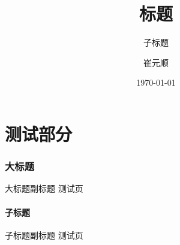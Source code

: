 \documentclass[10pt,mathserif]{beamer}%
\title{标题}
\subtitle{子标题}
\institute[西安电子科技大学\\数学与统计学院]{西安电子科技大学数学与统计学院12级本科生} %
\author{崔元顺}
\date{\today}%
\begin{document}
%
{\xdbg {}}%

\part{测试部分}

\section{大标题}
\begin{frame}{大标题}{副标题}
	测试页
\end{frame}

\subsection{子标题}
\begin{frame}{子标题}{副标题}
	测试页
\end{frame}

{\xdbg%
\begin{frame}
\end{frame}}
\end{document}
